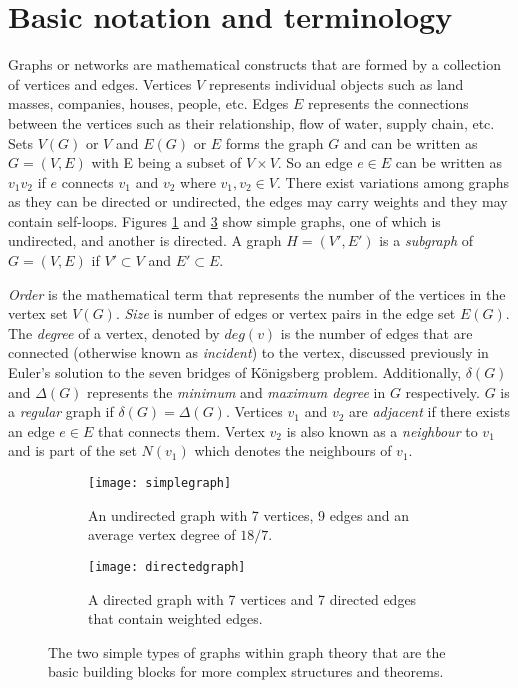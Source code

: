 \section{Basic notation and terminology}
Graphs or networks are mathematical constructs that are formed by a collection of vertices and edges. Vertices $V$ represents individual objects such as land masses, companies, houses, people, etc. Edges $E$ represents the connections between the vertices such as their relationship, flow of water, supply chain, etc. Sets $V(G)$ or $V$ and $E(G)$ or $E$ forms the graph $G$ and can be written as $G=(V, E)$ with E being a subset of $V \times V$. So an edge $e \in E$ can be written as $v_{1}v_{2}$ if $e$ connects $v_{1}$ and $v_{2}$ where $v_{1}, v_{2} \in V$. There exist variations among graphs as they can be directed or undirected, the edges may carry weights and they may contain self-loops. Figures \ref{fig:Simple Graph} and \ref{fig:Directed Graph} show simple graphs, one of which is undirected, and another is directed. A graph $H = (V', E')$ is a \emph{subgraph} of $G=(V, E)$ if $V' \subset V$ and $E' \subset E$.

\emph{Order} is the mathematical term that represents the number of the vertices in the vertex set $V(G)$. \emph{Size} is number of edges or vertex pairs in the edge set $E(G)$. The \emph{degree} of a vertex, denoted by $deg(v)$ is the number of edges that are connected (otherwise known as \emph{incident}) to the vertex, discussed previously in Euler's solution to the seven bridges of Königsberg problem. Additionally, $\delta(G)$ and $\Delta(G)$ represents the \emph{minimum} and \emph{maximum degree} in $G$ respectively. $G$ is a \emph{regular} graph if $\delta(G) = \Delta(G)$. Vertices $v_{1}$ and $v_{2}$ are \emph{adjacent} if there exists an edge $e \in E$ that connects them. Vertex $v_{2}$ is also known as a \emph{neighbour} to $v_{1}$ and is part of the set $N(v_{1})$ which denotes the neighbours of $v_{1}$. 
\newline

\begin{figure}[!htb]
\centering
\begin{subfigure}{.45\textwidth}
	\texttt{[image: simplegraph]}
	\caption{An undirected graph with 7 vertices, 9 edges and an average vertex degree of $18/7$.}
	\label{fig:Simple Graph}
\end{subfigure}
\hfill
\begin{subfigure}{.45\textwidth}
	\texttt{[image: directedgraph]}
	\caption{A directed graph with 7 vertices and 7 directed edges that contain weighted edges.}
	\label{fig:Directed Graph}
\end{subfigure}
\caption{The two simple types of graphs within graph theory that are the basic building blocks for more complex structures and theorems.}
\end{figure}

